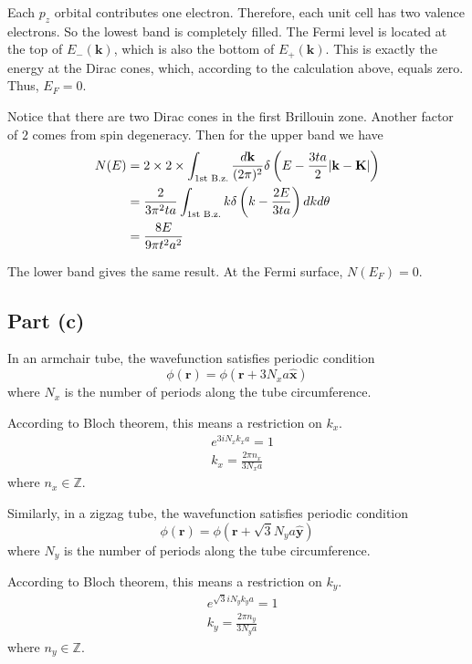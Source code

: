 \documentclass{article}
\begin{document}
Each $p_z$ orbital contributes one electron. Therefore, each unit cell has two valence electrons. So the lowest band is completely filled. The Fermi level is located at the top of $E_-(\mathbf{k})$, which is also the bottom of $E_+(\mathbf{k})$. This is exactly the energy at the Dirac cones, which, according to the calculation above, equals zero. Thus, $E_F=0$.


Notice that there are two Dirac cones in the first Brillouin zone. Another factor of $2$ comes from spin degeneracy. Then for the upper band we have
\begin{align*}
	N(E)&=2\times 2\times\int_{\textup{1st B.z.}}\frac{d\mathbf{k}}{(2\pi)^2}\delta\left(E-\frac{3ta}{2}|\mathbf{k}-\mathbf{K}|\right)\\
	&=\frac{2}{3\pi^2ta}\int_{\textup{1st B.z.}}k\delta\left(k-\frac{2E}{3ta}\right)dkd\theta\\
	&=\frac{8E}{9\pi t^2a^2}
\end{align*}

The lower band gives the same result. At the Fermi surface, $N(E_F)=0$.

\subsection{Part (c)}
In an armchair tube, the wavefunction satisfies periodic condition
\begin{equation*}
	\phi(\mathbf{r})=\phi(\mathbf{r}+3N_xa\hat{\mathbf{x}})
\end{equation*}
where $N_x$ is the number of periods along the tube circumference.

According to Bloch theorem, this means a restriction on $k_x$.
\begin{align*}
	&e^{3iN_xk_xa}=1\\
	&k_x=\frac{2\pi n_x}{3N_xa}
\end{align*}
where $n_x\in\mathbb{Z}$.

Similarly, in a zigzag tube, the wavefunction satisfies periodic condition
\begin{equation*}
	\phi(\mathbf{r})=\phi(\mathbf{r}+\sqrt{3}N_ya\hat{\mathbf{y}})
\end{equation*}
where $N_y$ is the number of periods along the tube circumference.

According to Bloch theorem, this means a restriction on $k_y$.
\begin{align*}
	&e^{\sqrt{3}iN_yk_ya}=1\\
	&k_y=\frac{2\pi n_y}{3N_ya}
\end{align*}
where $n_y\in\mathbb{Z}$.
\end{document}
